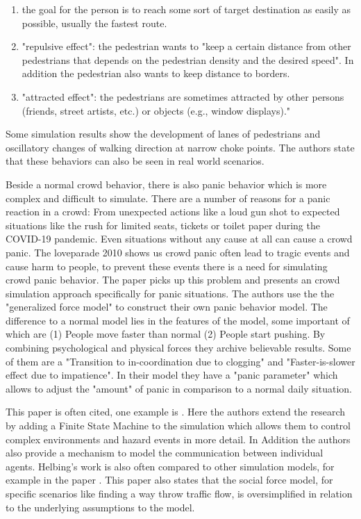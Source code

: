\documentclass{acmsiggraph}               %
\begin{document}
\begin{enumerate}
    \item the goal for the person is to reach some sort of target destination as easily as possible, usually the fastest route.
    \item "repulsive effect": the pedestrian wants to "keep a certain distance from other pedestrians that depends on the pedestrian density and the desired speed". In addition the pedestrian also wants to keep distance to borders.  
    \item "attracted effect": the pedestrians are sometimes attracted by other persons (friends, street artists, etc.) or objects (e.g., window displays)."
\end{enumerate}
Some simulation results show the development of lanes of pedestrians and oscillatory changes of walking direction at narrow choke points. The authors state that these behaviors can also be seen in real world scenarios. 

Beside a normal crowd behavior, there is also panic behavior which is more complex and difficult to simulate. There are a number of reasons for a panic reaction in a crowd: From unexpected actions like a loud gun shot to expected situations like the rush for limited seats, tickets or toilet paper during the COVID-19 pandemic. Even situations without any cause at all can cause a crowd panic. The loveparade 2010 shows us crowd panic often lead to tragic events and cause harm to people, to prevent these events there is a need for simulating crowd panic behavior. 
The paper \cite{helbing_simulating_2000} picks up this problem and presents an crowd simulation approach specifically for panic situations. The authors use the the "generalized force model" \cite{hindsley_investigation_1986} to construct their own panic behavior model. The difference to a normal model lies in the features of the model, some important of which are (1) People move faster than normal (2) People start pushing. By combining psychological and physical forces they archive believable results. Some of them are a "Transition to in-coordination due to clogging" and "Faster-is-slower effect due to impatience". 
In their model they have a "panic parameter" \label{term:panicParameter} which allows to adjust the "amount" of panic in comparison to a normal daily situation. 

This paper is often cited, one example is \cite{braun_simulating_2005}\label{exp:braun2005}. Here the authors extend the research by adding a Finite State Machine to the simulation which allows them to control complex environments and hazard events in more detail. In Addition the authors also provide a mechanism to model the communication between individual agents. Helbing's work is also often compared to other simulation models, for example in the paper \cite{zheng_modeling_2009}. This paper also states that the social force model, for specific scenarios like finding a way throw traffic flow, is oversimplified in relation to the underlying assumptions to the model.
\end{document}
